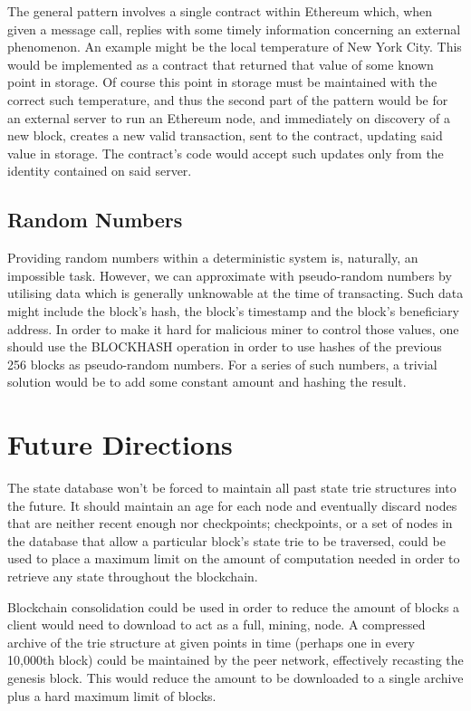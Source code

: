 \documentclass[9pt,oneside]{amsart}
\begin{document}
\begin{multicols}{2}
The general pattern involves a single contract within Ethereum which, when given a message call, replies with some timely information concerning an external phenomenon. An example might be the local temperature of New York City. This would be implemented as a contract that returned that value of some known point in storage. Of course this point in storage must be maintained with the correct such temperature, and thus the second part of the pattern would be for an external server to run an Ethereum node, and immediately on discovery of a new block, creates a new valid transaction, sent to the contract, updating said value in storage. The contract's code would accept such updates only from the identity contained on said server.

\subsection{Random Numbers}
Providing random numbers within a deterministic system is, naturally, an impossible task. However, we can approximate with pseudo-random numbers by utilising data which is generally unknowable at the time of transacting. Such data might include the block's hash, the block's timestamp and the block's beneficiary address. In order to make it hard for malicious miner to control those values, one should use the {\small BLOCKHASH} operation in order to use hashes of the previous 256 blocks as pseudo-random numbers. For a series of such numbers, a trivial solution would be to add some constant amount and hashing the result.

\section{Future Directions} \label{ch:future}

The state database won't be forced to maintain all past state trie structures into the future. It should maintain an age for each node and eventually discard nodes that are neither recent enough nor checkpoints; checkpoints, or a set of nodes in the database that allow a particular block's state trie to be traversed, could be used to place a maximum limit on the amount of computation needed in order to retrieve any state throughout the blockchain.

Blockchain consolidation could be used in order to reduce the amount of blocks a client would need to download to act as a full, mining, node. A compressed archive of the trie structure at given points in time (perhaps one in every 10,000th block) could be maintained by the peer network, effectively recasting the genesis block. This would reduce the amount to be downloaded to a single archive plus a hard maximum limit  of blocks.


\end{multicols}
\end{document}
